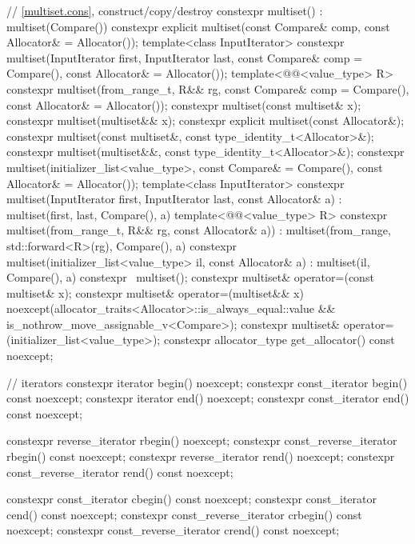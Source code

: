 \begin{codeblock}
{{    // \ref{multiset.cons}, construct/copy/destroy
    constexpr multiset() : multiset(Compare()) { }
    constexpr explicit multiset(const Compare& comp, const Allocator& = Allocator());
    template<class InputIterator>
      constexpr multiset(InputIterator first, InputIterator last,
                         const Compare& comp = Compare(), const Allocator& = Allocator());
    template<@@<value_type> R>
      constexpr multiset(from_range_t, R&& rg,
                         const Compare& comp = Compare(), const Allocator& = Allocator());
    constexpr multiset(const multiset& x);
    constexpr multiset(multiset&& x);
    constexpr explicit multiset(const Allocator&);
    constexpr multiset(const multiset&, const type_identity_t<Allocator>&);
    constexpr multiset(multiset&&, const type_identity_t<Allocator>&);
    constexpr multiset(initializer_list<value_type>, const Compare& = Compare(),
                       const Allocator& = Allocator());
    template<class InputIterator>
      constexpr multiset(InputIterator first, InputIterator last, const Allocator& a)
        : multiset(first, last, Compare(), a) { }
    template<@@<value_type> R>
      constexpr multiset(from_range_t, R&& rg, const Allocator& a))
        : multiset(from_range, std::forward<R>(rg), Compare(), a) { }
    constexpr multiset(initializer_list<value_type> il, const Allocator& a)
      : multiset(il, Compare(), a) { }
    constexpr ~multiset();
    constexpr multiset& operator=(const multiset& x);
    constexpr multiset& operator=(multiset&& x)
      noexcept(allocator_traits<Allocator>::is_always_equal::value &&
               is_nothrow_move_assignable_v<Compare>);
    constexpr multiset& operator=(initializer_list<value_type>);
    constexpr allocator_type get_allocator() const noexcept;

    // iterators
    constexpr iterator               begin() noexcept;
    constexpr const_iterator         begin() const noexcept;
    constexpr iterator               end() noexcept;
    constexpr const_iterator         end() const noexcept;

    constexpr reverse_iterator       rbegin() noexcept;
    constexpr const_reverse_iterator rbegin() const noexcept;
    constexpr reverse_iterator       rend() noexcept;
    constexpr const_reverse_iterator rend() const noexcept;

    constexpr const_iterator         cbegin() const noexcept;
    constexpr const_iterator         cend() const noexcept;
    constexpr const_reverse_iterator crbegin() const noexcept;
    constexpr const_reverse_iterator crend() const noexcept;

}}
\end{codeblock}
